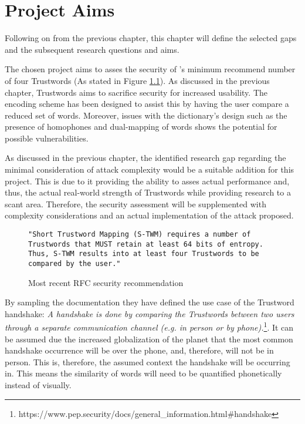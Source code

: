\chapter{Project Aims}

Following on from the previous chapter, this chapter will define the selected gaps and the subsequent research questions and aims.

The chosen project aims to asses the security of \pep's minimum recommend number of four Trustwords (As stated in Figure \ref{fig:trustwordsNum}). As discussed in the previous chapter, Trustwords aims to sacrifice security for increased usability. The encoding scheme has been designed to assist this by having  the user compare a reduced set of words. Moreover, issues with the dictionary's design such as the presence of homophones and dual-mapping of words shows the potential for possible vulnerabilities. 

As discussed in the previous chapter, the identified research gap regarding the minimal consideration of attack complexity would be a suitable addition for this project. This is due to it providing the ability to asses actual performance and, thus, the actual real-world strength of Trustwords while providing research to a scant area. Therefore, the security assessment will be supplemented with complexity considerations and an actual implementation of the attack proposed.

\begin{figure}[h!]
    \centering
    \begin{verbatim}
"Short Trustword Mapping (S-TWM) requires a number of 
Trustwords that MUST retain at least 64 bits of entropy. 
Thus, S-TWM results into at least four Trustwords to be 
compared by the user."
    \end{verbatim}
    \caption{Most recent RFC security recommendation}
    \label{fig:trustwordsNum}
\end{figure}

By sampling the \pep documentation they have defined the use case of the Trustword handshake: \textit{A handshake is done by comparing the Trustwords between two users through a separate communication channel (e.g. in person or by phone).}\footnote{https://www.pep.security/docs/general\_information.html\#handshake}. It can be assumed due the increased globalization of the planet that the most common handshake occurrence will be over the phone, and, therefore, will not be in person. This is, therefore, the assumed context the handshake will be occurring in. This means the similarity of words will need to be quantified phonetically instead of visually.

